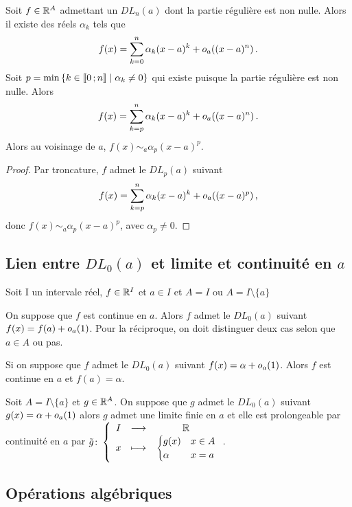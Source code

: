 Soit $f \in \mathbb{R}^A$ admettant un $DL_n(a)$ dont la partie régulière est non nulle. Alors il existe des réels $\alpha_k$ tels que
\begin{equation}
  f(x)=\sum_{k=0}^n \alpha_k (x-a)^k+o\mathopen{}_{a}\left((x-a)^n\right).
\end{equation}
Soit $p=\min\left\{k \in \mathopen{\llbracket}0\mathclose{}\mathpunct{};n\mathclose{\rrbracket}\mathrel{}\middle|\mathrel{}\alpha_k \neq 0\right\}$ qui existe puisque la partie régulière est non nulle. Alors
\begin{equation}
  f(x)=\sum_{k=p}^n \alpha_k (x-a)^k +o\mathopen{}_{a}\left((x-a)^n\right).
\end{equation}
Alors au voisinage de $a$, $f(x) \sim_a \alpha_p(x-a)^p$.
\begin{proof}
  Par troncature, $f$ admet le $DL_p(a)$ suivant
\begin{equation}
  f(x)=\sum_{k=p}^n \alpha_k (x-a)^k +o\mathopen{}_{a}\left((x-a)^p\right),
\end{equation}
donc $f(x) \sim_a \alpha_p(x-a)^p$, avec $\alpha_p \neq 0$.
\end{proof}

\subsection{Lien entre $DL_0(a)$ et limite et continuité en $a$}

Soit I un intervale réel, $f \in \mathbb{R}^I$ et $a \in I$ et $A=I$ ou $A=I\setminus\{a\}$
\begin{prop}
   On suppose que $f$ est continue en $a$. Alors $f$ admet le $DL_0(a)$ suivant $f(x)=f(a)+o\mathopen{}_{a}\left(1\right)$. Pour la réciproque, on doit distinguer deux cas selon que $a \in A$ ou pas.
\end{prop}
\begin{prop}
  Si on suppose que $f$ admet le $DL_0(a)$ suivant $f(x)=\alpha+o\mathopen{}_{a}\left(1\right)$. Alors $f$ est continue en $a$ et $f(a)=\alpha$. 
\end{prop}
\begin{prop}
  Soit $A=I\setminus\{a\}$ et $g \in \mathbb{R}^A$. On suppose que $g$ admet le $DL_0(a)$ suivant $g(x)= \alpha +o\mathopen{}_{a}\left(1\right)$ alors $g$ admet une limite finie en $a$ et elle est prolongeable par continuité en $a$ par $\tilde{g}\colon \left\{\begin{array}{ccc} I & \longrightarrow &\mathbb{R}\\ x & \longmapsto & \begin{cases} g(x) & x \in A \\ \alpha & x=a\end{cases} \end{array} \right.$.
\end{prop}

\subsection{Opérations algébriques}

